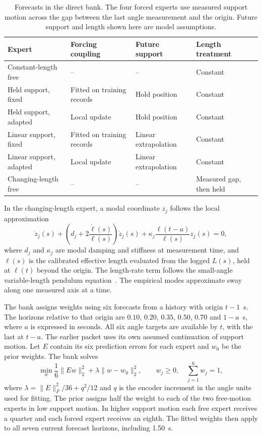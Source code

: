 \begin{table}[H]
\centering\small
\caption{Forecasts in the direct bank. The four forced experts use measured support motion across the gap between the last angle measurement and the origin. Future support and length shown here are model assumptions.}
\label{tab:experts}
\begin{tabular}{@{}llll@{}}
\toprule
Expert & Forcing coupling & Future support & Length treatment \\
\midrule
Constant-length free & -- & -- & Constant \\
Held support, fixed & Fitted on training records & Hold position & Constant \\
Held support, adapted & Local update & Hold position & Constant \\
Linear support, fixed & Fitted on training records & Linear extrapolation & Constant \\
Linear support, adapted & Local update & Linear extrapolation & Constant \\
Changing-length free & -- & -- & Measured gap, then held \\
\bottomrule
\end{tabular}
\end{table}

In the changing-length expert, a modal coordinate $z_j$ follows the local approximation
\begin{equation}
 \ddot z_j(s)+\left(d_j+2\frac{\dot\ell(s)}{\ell(s)}\right)\dot z_j(s)
 +\kappa_j\frac{\ell(t-a)}{\ell(s)}z_j(s)=0 ,
 \label{eq:variable-length}
\end{equation}
where $d_j$ and $\kappa_j$ are modal damping and stiffness at measurement time, and $\ell(s)$ is the calibrated effective length evaluated from the logged $L(s)$, held at $\ell(t)$ beyond the origin. The length-rate term follows the small-angle variable-length pendulum equation~\cite{belyakov2009,gonzalez2017}. The empirical modes approximate sway along one measured axis at a time.

The bank assigns weights using six forecasts from a history with origin $t-1$~s. The horizons relative to that origin are $0.10$, $0.20$, $0.35$, $0.50$, $0.70$ and $1-a$~s, where $a$ is expressed in seconds. All six angle targets are available by $t$, with the last at $t-a$. The earlier packet uses its own assumed continuation of support motion. Let $E$ contain its six prediction errors for each expert and $w_0$ be the prior weights. The bank solves
\begin{equation}
 \min_w \frac{1}{6}\lVert Ew\rVert_2^2+\lambda\lVert w-w_0\rVert_2^2,
 \qquad w_j\ge 0,\quad \sum_{j=1}^{6}w_j=1 ,
\end{equation}
where $\lambda=\lVert E\rVert_F^2/36+q^2/12$ and $q$ is the encoder increment in the angle units used for fitting. The prior assigns half the weight to each of the two free-motion experts in low support motion. In higher support motion each free expert receives a quarter and each forced expert receives an eighth. The fitted weights then apply to all seven current forecast horizons, including 1.50~s.

